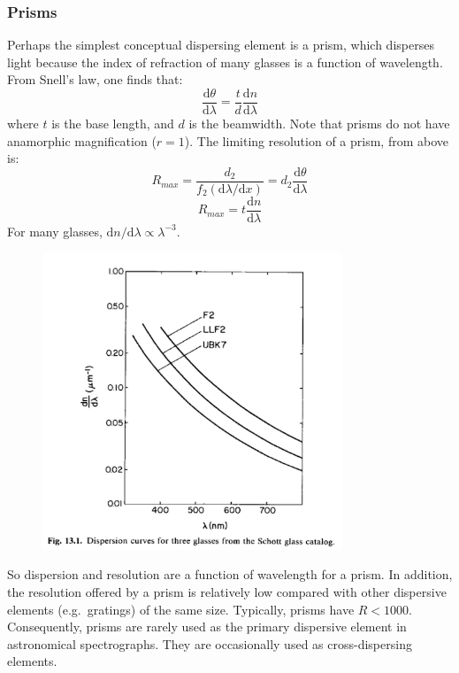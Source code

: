 \documentclass[12pt]{article}
\begin{document}
\subsubsection{Prisms}
Perhaps the simplest conceptual dispersing element is a prism, which
disperses light because the index of refraction of many glasses is a
function of wavelength. From Snell's law, one finds that:{$$
    \frac{\textrm{d}\theta}{\textrm{d}\lambda} =
    \frac{t}{d}\frac{\textrm{d}n}{\textrm{d}\lambda} $$
}where $t$ is the base length, and $d$ is the beamwidth. Note that prisms
do not have anamorphic magnification ($r=1$). The limiting resolution
of a prism, from above is:{$$
    R_{max} = \frac{d_{2}}{f_{2}(\textrm{d}\lambda/\textrm{d}x)} =
    d_{2}\frac{\textrm{d}\theta}{\textrm{d}\lambda} $$$$
    R_{max} = t\frac{\textrm{d}n}{\textrm{d}\lambda}
$$}For many glasses, $\textrm{d}n/\textrm{d}\lambda \propto \lambda^{-3}$.
\begin{figure}
    \centering
    \includegraphics[width=0.8\textwidth]{curves.png}
\end{figure}
So dispersion and resolution are a function of wavelength for a prism.
In addition, the resolution offered by a prism is relatively low
compared with other dispersive elements (e.g.\ gratings) of the same
size. Typically, prisms have $R < 1000$. Consequently, prisms are rarely
used as the primary dispersive element in astronomical spectrographs.
They are occasionally used as cross-dispersing elements.
\end{document}
